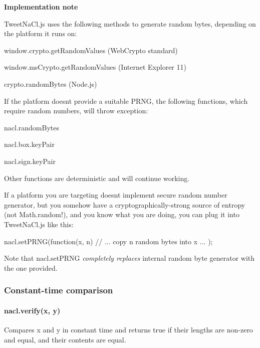 {\bfseries Implementation note}

Tweet\+Na\+Cl.\+js uses the following methods to generate random bytes, depending on the platform it runs on\+:


\begin{DoxyItemize}
\item {\ttfamily window.\+crypto.\+get\+Random\+Values} (Web\+Crypto standard)
\item {\ttfamily window.\+ms\+Crypto.\+get\+Random\+Values} (Internet Explorer 11)
\item {\ttfamily crypto.\+random\+Bytes} (Node.\+js)
\end{DoxyItemize}

If the platform doesn\textquotesingle{}t provide a suitable P\+R\+NG, the following functions, which require random numbers, will throw exception\+:


\begin{DoxyItemize}
\item {\ttfamily nacl.\+random\+Bytes}
\item {\ttfamily nacl.\+box.\+key\+Pair}
\item {\ttfamily nacl.\+sign.\+key\+Pair}
\end{DoxyItemize}

Other functions are deterministic and will continue working.

If a platform you are targeting doesn\textquotesingle{}t implement secure random number generator, but you somehow have a cryptographically-\/strong source of entropy (not {\ttfamily Math.\+random}!), and you know what you are doing, you can plug it into Tweet\+Na\+Cl.\+js like this\+: \begin{DoxyVerb}nacl.setPRNG(function(x, n) {
  // ... copy n random bytes into x ...
});
\end{DoxyVerb}


Note that {\ttfamily nacl.\+set\+P\+R\+NG} {\itshape completely replaces} internal random byte generator with the one provided.

\subsubsection*{Constant-\/time comparison}

\paragraph*{nacl.\+verify(x, y)}

Compares {\ttfamily x} and {\ttfamily y} in constant time and returns {\ttfamily true} if their lengths are non-\/zero and equal, and their contents are equal.

